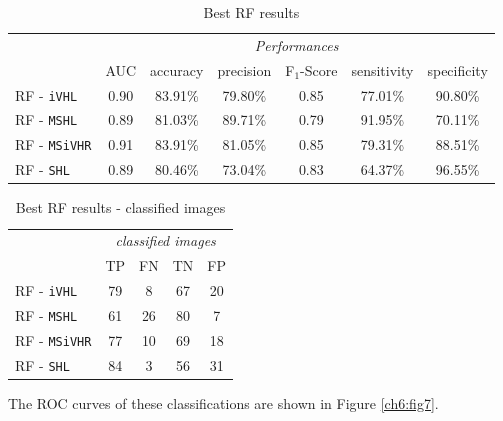 \begin{table}[!hbt]
\small
 \centering
 \begin{tabular}{lcccccc}
  \toprule
  & \multicolumn{6}{c}{\textit{Performances}} \\
  \cmidrule(lr){2-7}
  & AUC  & accuracy & precision & F$_1$-Score & sensitivity & specificity \\
  \midrule
    RF - \texttt{iVHL}      &  0.90 & \cellcolor{YellowGreen} 83.91\% & 79.80\% & \cellcolor{YellowGreen} 0.85 & 77.01\% & 90.80\%  \\
    RF - \texttt{MSHL}     & 0.89 & 81.03\% & \cellcolor{YellowGreen} 89.71\% & 0.79 & \cellcolor{YellowGreen} 91.95\% & 70.11\%  \\
    RF - \texttt{MSiVHR}     & \cellcolor{YellowGreen} 0.91 & \cellcolor{YellowGreen} 83.91\% & 81.05\% & 0.85 & 79.31\% & 88.51\%  \\
    RF - \texttt{SHL}     & 0.89 & 80.46\% & 73.04\% & 0.83 & 64.37\% & \cellcolor{YellowGreen} 96.55\% \\
    \bottomrule
 \end{tabular}
 \caption{Best RF results}
 \label{ch6:tab11}
\end{table}



\begin{table}[!hbt]
\small
 \centering
 \begin{tabular}{lcccc}
  \toprule
  & \multicolumn{4}{c}{\textit{classified images}} \\
  \cmidrule(lr){2-5}
   & TP  & FN & TN & FP  \\
   \midrule
    RF - \texttt{iVHL}      & 79 & 8 & 67 & 20  \\
    RF - \texttt{MSHL}     & 61 & 26 & \cellcolor{YellowGreen} 80 & 7  \\
    RF - \texttt{MSiVHR}     & 77 & 10 & 69 & 18  \\
    RF - \texttt{SHL}     & \cellcolor{YellowGreen} 84 & 3 & 56 & 31 \\
    \bottomrule
 \end{tabular}
 \caption{Best RF results - classified images}
 \label{ch6:tab12}
\end{table}  


\noindent The \Gls{ROC} curves of these classifications are shown in Figure \ref{ch6:fig7}.

